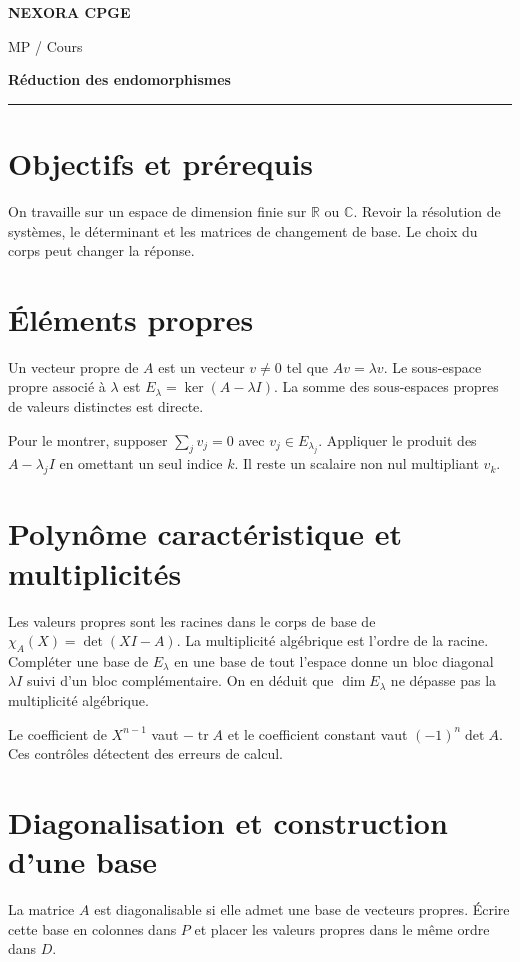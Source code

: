 \documentclass[11pt,a4paper]{article}
\begin{document}
{\small\bfseries\color{nexorablue} NEXORA CPGE}\par
{\small MP / Cours}\par
{\LARGE\bfseries Réduction des endomorphismes}\par
\vspace{0.25em}\hrule\vspace{0.6em}

\section*{Objectifs et prérequis}
On travaille sur un espace de dimension finie sur $\mathbb R$ ou $\mathbb C$. Revoir la résolution de systèmes, le déterminant et les matrices de changement de base. Le choix du corps peut changer la réponse.

\section*{Éléments propres}
Un vecteur propre de $A$ est un vecteur $v\ne0$ tel que $Av=\lambda v$. Le sous-espace propre associé à $\lambda$ est $E_\lambda=\ker(A-\lambda I)$. La somme des sous-espaces propres de valeurs distinctes est directe.

Pour le montrer, supposer $\sum_j v_j=0$ avec $v_j\in E_{\lambda_j}$. Appliquer le produit des $A-\lambda_j I$ en omettant un seul indice $k$. Il reste un scalaire non nul multipliant $v_k$.

\section*{Polynôme caractéristique et multiplicités}
Les valeurs propres sont les racines dans le corps de base de $\chi_A(X)=\det(XI-A)$. La multiplicité algébrique est l’ordre de la racine. Compléter une base de $E_\lambda$ en une base de tout l’espace donne un bloc diagonal $\lambda I$ suivi d’un bloc complémentaire. On en déduit que $\dim E_\lambda$ ne dépasse pas la multiplicité algébrique.

Le coefficient de $X^{n-1}$ vaut $-\operatorname{tr}A$ et le coefficient constant vaut $(-1)^n\det A$. Ces contrôles détectent des erreurs de calcul.

\section*{Diagonalisation et construction d’une base}
La matrice $A$ est diagonalisable si elle admet une base de vecteurs propres. Écrire cette base en colonnes dans $P$ et placer les valeurs propres dans le même ordre dans $D$.
\end{document}
